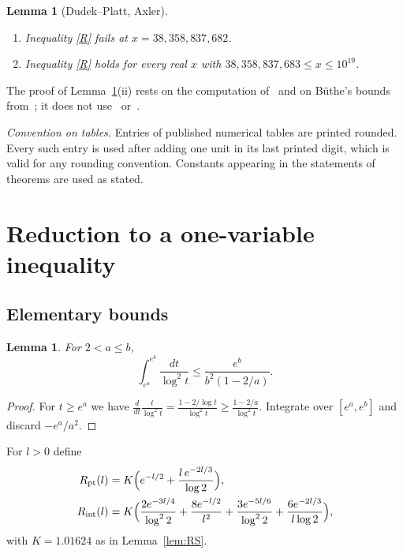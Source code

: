 \documentclass{amsart}
\newtheorem{lemma}[theorem]{Lemma}
\theoremstyle{definition}
\theoremstyle{remark}
\theoremstyle{plain}
\numberwithin{equation}{section}
\newcommand{\NN}{38{,}358{,}837{,}683}
\newcommand{\NNm}{38{,}358{,}837{,}682}
\newcommand{\Rpt}{R_{\mathrm{pt}}}
\newcommand{\Rint}{R_{\mathrm{int}}}
\begin{document}
\begin{lemma}[Dudek--Platt, Axler]\label{lem:base}
\begin{enumerate}
\item[(i)] \cite{DP15} Inequality \eqref{R} fails at $x=\NNm$.
\item[(ii)] \cite[Thm.~1.3]{Ax17} Inequality \eqref{R} holds for every real $x$ with $\NN\le x\le10^{19}$.
\end{enumerate}
\end{lemma}

The proof of Lemma~\ref{lem:base}(ii) rests on the computation of~\cite{DP15} and on B\"uthe's bounds from~\cite[Thm.~2]{But18}; it does not use~\cite[Lemma~2.1]{DP15} or~\cite[Thm.~1]{But16}.

\emph{Convention on tables.} Entries of published numerical tables are printed rounded. Every such entry is used after adding one unit in its last printed digit, which is valid for any rounding convention. Constants appearing in the statements of theorems are used as stated.

\section{Reduction to a one-variable inequality}\label{sec:criterion}

\subsection{Elementary bounds}

\begin{lemma}\label{lem:int}
For $2<a\le b$,
\[
\int_{e^a}^{e^b}\frac{dt}{\log^2t}\le\frac{e^b}{b^2(1-2/a)}.
\]
\end{lemma}

\begin{proof}
For $t\ge e^a$ we have $\frac{d}{dt}\frac{t}{\log^2t}=\frac{1-2/\log t}{\log^2t}\ge\frac{1-2/a}{\log^2t}$. Integrate over $[e^a,e^b]$ and discard $-e^a/a^2$.
\end{proof}

For $l>0$ define
\begin{align*}
\Rpt(l)&=K\Bigl(e^{-l/2}+\frac{l\,e^{-2l/3}}{\log2}\Bigr),\\
\Rint(l)&=K\Bigl(\frac{2e^{-3l/4}}{\log^22}+\frac{8e^{-l/2}}{l^2}+\frac{3e^{-5l/6}}{\log^22}+\frac{6e^{-2l/3}}{l\log2}\Bigr),
\end{align*}
with $K=1.01624$ as in Lemma~\ref{lem:RS}.
\end{document}
